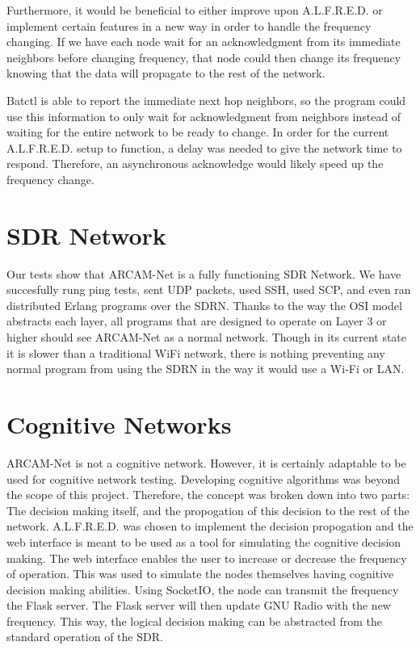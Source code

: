 Furthermore, it would be beneficial to either improve upon A.L.F.R.E.D. or implement certain features in a new way in order to handle the frequency changing. If we have each node wait for an acknowledgment from its immediate neighbors before changing frequency, that node could then change its frequency knowing that the data will propagate to the rest of the network. 

Batctl is able to report the immediate next hop neighbors, so the program could use this information to only wait for acknowledgment from neighbors instead of waiting for the entire network to be ready to change. In order for the current A.L.F.R.E.D. setup to function, a delay was needed to give the network time to respond. Therefore, an asynchronous acknowledge would likely speed up the frequency change. 



\section{SDR Network}

Our tests show that ARCAM-Net is a fully functioning SDR Network. We have succesfully rung ping tests, sent UDP packets, used SSH, used SCP, and even ran distributed Erlang programs over the SDRN. Thanks to the way the OSI model abstracts each layer, all programs that are designed to operate on Layer 3 or higher should see ARCAM-Net as a normal network. Though in its current state it is slower than a traditional WiFi network, there is nothing preventing any normal program from using the SDRN in the way it would use a Wi-Fi or LAN. 


\section{Cognitive Networks}

ARCAM-Net is not a cognitive network. However, it is certainly adaptable to be used for cognitive network testing. Developing cognitive algorithms was beyond the scope of this project. Therefore, the concept was broken down into two parts: The decision making itself, and the propogation of this decision to the rest of the network. A.L.F.R.E.D. was chosen to implement the decision propogation and the web interface is meant to be used as a tool for simulating the cognitive decision making. The web interface enables the user to increase or decrease the frequency of operation. This was used to simulate the nodes themselves having cognitive decision making abilities. Using SocketIO, the node can transmit the frequency the Flask server. The Flask server will then update GNU Radio with the new frequency. This way, the logical decision making can be abstracted from the standard operation of the SDR. 

